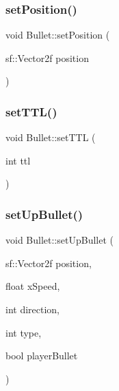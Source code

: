 \mbox{\label{class_bullet_a143a06245534960d6af5ffb10b101750}} 
\subsubsection{\texorpdfstring{set\+Position()}{setPosition()}}
{\footnotesize\ttfamily void Bullet\+::set\+Position (\begin{DoxyParamCaption}\item[{sf\+::\+Vector2f}]{position }\end{DoxyParamCaption})}

\mbox{\label{class_bullet_abbf2bd440aade1c9f0f8f61d333ca64a}} 
\subsubsection{\texorpdfstring{set\+T\+T\+L()}{setTTL()}}
{\footnotesize\ttfamily void Bullet\+::set\+T\+TL (\begin{DoxyParamCaption}\item[{int}]{ttl }\end{DoxyParamCaption})}

\mbox{\label{class_bullet_a2ac1e1ac43af3bbd0d7c2a72e0e17e51}} 
\subsubsection{\texorpdfstring{set\+Up\+Bullet()}{setUpBullet()}}
{\footnotesize\ttfamily void Bullet\+::set\+Up\+Bullet (\begin{DoxyParamCaption}\item[{sf\+::\+Vector2f}]{position,  }\item[{float}]{x\+Speed,  }\item[{int}]{direction,  }\item[{int}]{type,  }\item[{bool}]{player\+Bullet }\end{DoxyParamCaption})}

\mbox{\label{class_bullet_afa7788ce043c909b96c37a0265755000}} 
